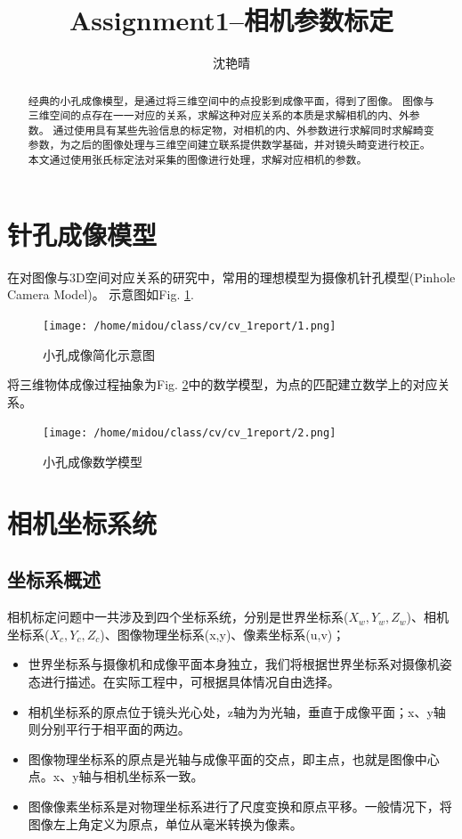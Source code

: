 \documentclass[10pt,a4paper]{article}
\author{沈艳晴}
\title{Assignment1--相机参数标定}
\begin{document}
\begin{CJK*}{UTF8}{gbsn}
\CJKindent%
\maketitle


\begin{abstract}
经典的小孔成像模型，是通过将三维空间中的点投影到成像平面，得到了图像。
图像与三维空间的点存在一一对应的关系，求解这种对应关系的本质是求解相机的内、外参数。
通过使用具有某些先验信息的标定物，对相机的内、外参数进行求解同时求解畸变参数，为之后的图像处理与三维空间建立联系提供数学基础，并对镜头畸变进行校正。
本文通过使用张氏标定法对采集的图像进行处理，求解对应相机的参数。
\end{abstract}

\section{针孔成像模型}

在对图像与3D空间对应关系的研究中，常用的理想模型为摄像机针孔模型(Pinhole Camera Model)。
示意图如Fig. \ref{fig:camera1}.
\begin{figure}[htbp]
    \centering
    \texttt{[image: /home/midou/class/cv/cv\_1report/1.png]}
    \caption{小孔成像简化示意图}
    \label{fig:camera1}
\end{figure}

将三维物体成像过程抽象为Fig. \ref{fig:camera2}中的数学模型，为点的匹配建立数学上的对应关系。
\begin{figure}[htbp]
    \centering
    \texttt{[image: /home/midou/class/cv/cv\_1report/2.png]}
    \caption{小孔成像数学模型}
    \label{fig:camera2}
\end{figure}

\section{相机坐标系统}
\subsection{坐标系概述}
相机标定问题中一共涉及到四个坐标系统，分别是世界坐标系($X_w,Y_w,Z_w$)、相机坐标系($X_c,Y_c,Z_c$)、图像物理坐标系(x,y)、像素坐标系(u,v)；

\begin{itemize}
    \item 世界坐标系与摄像机和成像平面本身独立，我们将根据世界坐标系对摄像机姿态进行描述。在实际工程中，可根据具体情况自由选择。
    \item 相机坐标系的原点位于镜头光心处，z轴为为光轴，垂直于成像平面；x、y轴则分别平行于相平面的两边。
    \item 图像物理坐标系的原点是光轴与成像平面的交点，即主点，也就是图像中心点。x、y轴与相机坐标系一致。
    \item 图像像素坐标系是对物理坐标系进行了尺度变换和原点平移。一般情况下，将图像左上角定义为原点，单位从毫米转换为像素。　
\end{itemize}


\end{CJK*}
\end{document}
